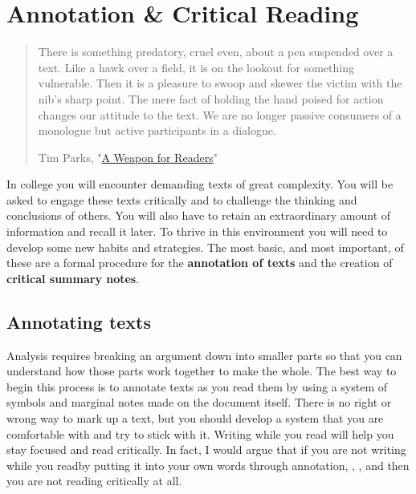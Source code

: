 


\chapter{Annotation \& Critical Reading}

\begin{quote} \small There is something predatory, cruel even, about a pen
suspended over a text. Like a hawk over a field, it is on the lookout for
something vulnerable. Then it is a pleasure to swoop and skewer the victim with
the nib’s sharp point. The mere fact of holding the hand poised for action
changes our attitude to the text. We are no longer passive consumers of a
monologue but active participants in a dialogue.

\textemdash Tim Parks,
"\href{http://www.nybooks.com/blogs/nyrblog/2014/dec/03/weapon-for-readers/}{A
Weapon for Readers}"

\end{quote}

In college you will encounter demanding texts of great complexity. You will be
asked to engage these texts critically and to challenge the thinking and conclusions of others. You will also have to retain an extraordinary amount of information and recall it later. To thrive in this environment you will need to develop some new habits and strategies. The most basic, and most important, of these are a formal procedure for the \textbf{annotation of texts} and the creation of \textbf{critical summary notes}. 

\section{Annotating texts}

Analysis requires breaking an argument down into smaller parts so that you can
understand how those parts work together to make the whole. The best way to
begin this process is to annotate texts as you read them by using a system of symbols and marginal notes made on the document itself. There is no right or wrong way to mark up a text, but you should develop
a system that you are comfortable with and try to stick with it. Writing while
you read will help you stay focused and read critically. In fact, I would argue
that if you are not writing while you read\textemdash by putting it into your
own words through annotation, \hyperlink{summary}{\color{Ahrenge}{summary}}, \hyperlink{paraphrase}{\color{Ahrenge}{paraphrase}}, and \hyperlink{quotation}{\color{Ahrenge}{quotation}}\textemdash then you are not reading critically at all.

